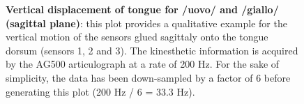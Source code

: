 \begin{figure}
  \centering
	\hspace{0.05\textwidth}

	\caption[Vertical displacement of tongue for /uovo/ and /giallo/ (sagittal
	plane)]{\textbf{Vertical
	displacement of tongue for /uovo/ and /giallo/ (sagittal plane)}: 
	this plot provides a qualitative example for the vertical motion of the
	sensors glued sagittaly onto the tongue dorsum (sensors 1, 2 and 3).
	The kinesthetic information is acquired by the AG500 articulograph at
	a rate of 200 Hz. For the sake of simplicity, the data has been down-sampled
	by a factor of 6 before generating this plot (200 Hz / 6 = 33.3 Hz).
	}
	\label{fig:results:mesh:complex}
\end{figure}
